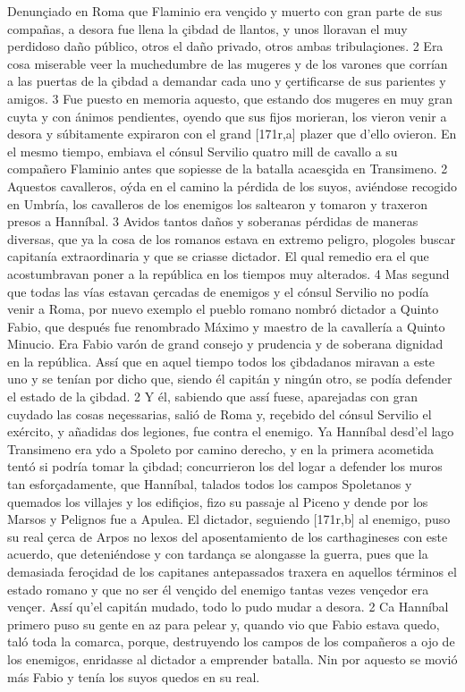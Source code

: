 \documentclass[11pt,twoside]{article}\makeatletter
\def\persName{}\def\name{}
\def\placeName{}
\begin{document}
\pend
{} Denunçiado en  {\placeName Roma} que Flaminio era vençido y muerto con gran parte de sus compañas, a desora fue llena la çibdad de llantos, y unos lloravan el muy perdidoso daño público, otros el daño privado, otros ambas tribulaçiones. 2 Era cosa miserable veer la muchedumbre de las mugeres y de los varones que corrían a las puertas de la çibdad a demandar cada uno y çertificarse de sus parientes y amigos. 3 Fue puesto en memoria aquesto, que estando dos mugeres en muy gran cuyta y con ánimos pendientes, oyendo que sus fijos morieran, los vieron venir a desora y súbitamente expiraron con el grand %
[171r,a] plazer que d’ello ovieron.
\pend
{} En el mesmo tiempo, embiava el cónsul Servilio quatro mill de cavallo a su compañero Flaminio antes que sopiesse de la batalla acaesçida en Transimeno. 2 Aquestos cavalleros, oýda en el camino la pérdida de los suyos, aviéndose recogido en Umbría, los cavalleros de los enemigos los saltearon y tomaron y traxeron presos a  {\persName Hanníbal}. 3 Avidos tantos daños y soberanas pérdidas de maneras diversas, que ya la cosa de los romanos estava en extremo peligro, plogoles buscar capitanía extraordinaria y que se criasse dictador. El qual remedio era el que acostumbravan poner a la república en los tiempos muy alterados. 4 Mas segund que todas las vías estavan çercadas de enemigos y el cónsul Servilio no podía venir a Roma, por nuevo exemplo el pueblo romano nombró dictador a Quinto Fabio, que después fue renombrado Máximo y maestro de la cavallería a Quinto Minucio.
\pend
{} Era Fabio varón de grand consejo y prudencia y de soberana dignidad en la república. Assí que en aquel tiempo todos los çibdadanos miravan a este uno y se tenían por dicho que, siendo él capitán y ningún otro, se podía defender el estado de la çibdad. 2 Y él, sabiendo que assí fuese, aparejadas con gran cuydado las cosas neçessarias, salió de  {\placeName Roma} y, reçebido del cónsul Servilio el exército, y añadidas dos legiones, fue contra el enemigo.
\pend
{} Ya  {\persName Hanníbal} desd’el lago Transimeno era ydo a Spoleto por camino derecho, y en la primera acometida tentó si podría tomar la çibdad; concurrieron los del logar a defender los muros tan esforçadamente, que  {\persName Hanníbal}, talados todos los campos Spoletanos y quemados los villajes y los edifiçios, fizo su passaje al Piceno y dende por los Marsos y Pelignos fue a Apulea.
\pend
{} El dictador, seguiendo %
[171r,b] al enemigo, puso su real çerca de Arpos no lexos del aposentamiento de los  {\name carthagineses} con este acuerdo, que deteniéndose y con tardança se alongasse la guerra, pues que la demasiada feroçidad de los capitanes antepassados traxera en aquellos términos el estado romano y que no ser él vençido del enemigo tantas vezes vençedor era vençer. Assí qu’el capitán mudado, todo lo pudo mudar a desora. 2 Ca  {\persName Hanníbal} primero puso su gente en az para pelear y, quando vio que Fabio estava quedo, taló toda la comarca, porque, destruyendo los campos de los compañeros a ojo de los enemigos, enridasse al dictador a emprender batalla. Nin por aquesto se movió más Fabio y tenía los suyos quedos en su real.
\end{document}
